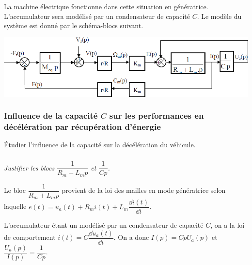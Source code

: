 \documentclass[10pt,fleqn]{article} %
\begin{document}
La machine électrique fonctionne dans cette situation en génératrice.
L’accumulateur sera modélisé par un condensateur de capacité $C$.
Le modèle du système est donné par le schéma-blocs suivant.


\begin{center}
\includegraphics[width=\linewidth]{images/ccmp_04}
\end{center}


\subsubsection*{Influence de la capacité $C$ sur les performances en décélération par récupération d’énergie}
\begin{obj}
Étudier l’influence de la capacité sur la décélération du véhicule.
\end{obj}

\subparagraph{}
\textit{Justifier les blocs $\dfrac{1}{R_m+L_m p}$ et $\dfrac{1}{Cp}$.}
\ifprof
\begin{corrige}
Le bloc $\dfrac{1}{R_m+L_m p}$ provient de la loi des mailles en mode génératrice selon laquelle $e(t)=u_a(t)+R_m i(t)+L_m \dfrac{\dd i(t)}{\dd t}$.

L'accumulateur étant un modélisé par un condensateur de capacité $C$, on a la loi de comportement $i(t)=C\dfrac{\dd u_a(t)}{\dd t}$. On a donc $I(p)=CpU_a(p)$ et $\dfrac{U_a(p)}{I(p)}=\dfrac{1}{Cp}$.
\end{corrige}
\else
\fi
\end{document}
